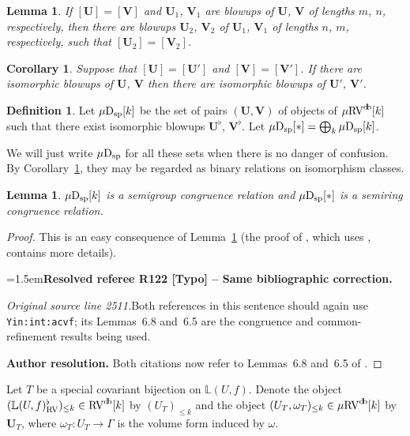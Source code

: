 \documentclass[12pt]{amsart}
\newcommand{\ResolvedRefereeRemark}[5]{%
  \par\medskip\begingroup\normalfont\small\color{gray}%
  \emergencystretch=1.5em\noindent\textbf{Resolved referee R#1 [#2] -- #3.}\par\nobreak\noindent #4\par
  \medskip\color{ResolutionGreen}\noindent\textbf{Author resolution.} #5\par
  \endgroup\medskip
}
\theoremstyle{plain}
\newtheorem{cor}[thm]{Corollary}
\newtheorem{lem}[thm]{Lemma}
\theoremstyle{definition}
\newtheorem{defn}[thm]{Definition}
\theoremstyle{remark}
\numberwithin{equation}{section}
\theoremstyle{plain}
\newcommand{\RV}{\textup{RV}}
\newcommand{\0}{\emptyset}
\newcommand{\bb}[1]{\mathbb{#1}}
\newcommand{\fun}{\longrightarrow}
\newcommand{\mRV}{{\mu}{\RV}}
\newcommand{\dsp}{\textup{D}_{\textup{sp}}}
\newcommand{\mispdb}{\mu \dsp}
\DeclareMathOperator{\db}{d \! b}
\begin{document}
\begin{lem}\label{blowup:equi:class:coa}
If $[\bm U] = [\bm V]$ and $\bm U_1$, $\bm V_1$ are blowups of $\bm U$, $\bm V$ of lengths $m$, $n$, respectively, then there are blowups $\bm U_2$, $\bm V_2$ of $\bm U_1$, $\bm V_1$ of lengths $n$, $m$, respectively, such that $[\bm U_2] = [\bm V_2]$.
\end{lem}

\begin{cor}\label{blowup:equi:class}
Suppose that $[\bm U] = [\bm U']$ and $[\bm V] = [\bm V']$. If there are isomorphic blowups of $\bm U$, $\bm V$ then there are isomorphic blowups of $\bm U'$, $\bm V'$.
\end{cor}

\begin{defn}
Let $\mispdb[k]$ be the set of pairs $(\bm U, \bm V)$ of objects of $\mRV^{\db}[k]$ such that there exist isomorphic blowups $\bm U^{\flat}$, $\bm V^{\flat}$. Let $\mispdb[*] = \bigoplus_{k} \mispdb[k]$.
\end{defn}

We will just write $\mispdb$ for all these sets when there is no danger of confusion. By Corollary~\ref{blowup:equi:class}, they may be regarded as binary relations on isomorphism classes.


\begin{lem}\label{isp:congruence:vol}
$\mispdb[k]$ is a semigroup congruence relation and $\mispdb[*]$ is a semiring congruence relation.
\end{lem}
\begin{proof}
This is an easy consequence of Lemma~\ref{blowup:equi:class:coa} (the proof of \cite[Lemma~6.8]{Yin:int:acvf}, which uses \cite[Lemma~6.5]{Yin:int:acvf}, contains more details).

\ResolvedRefereeRemark{122}{Typo}{Same bibliographic correction}{%
\textit{Original source line 2511.}\quad Both references in this sentence should again use \texttt{Yin:int:acvf}; its Lemmas~6.8 and~6.5 are the congruence and common-refinement results being used.
}{Both citations now refer to Lemmas~6.8 and~6.5 of \cite{Yin:int:acvf}.}
\end{proof}



Let  $T$ be a special covariant bijection on $\bb L (U,f)$. Denote the object $(\mathbb{L} (U,f)^\flat_{\RV})_{\leq k} \in \RV^{\db}[k]$ by $(U_{T})_{\leq k}$ and  the object $(U_{T}, \omega_T)_{\leq k} \in \mRV^{\db}[k]$ by $\bm U_{T}$, where $\omega_T : U_{T} \fun \Gamma$ is the volume form induced by $\omega$.
\end{document}
